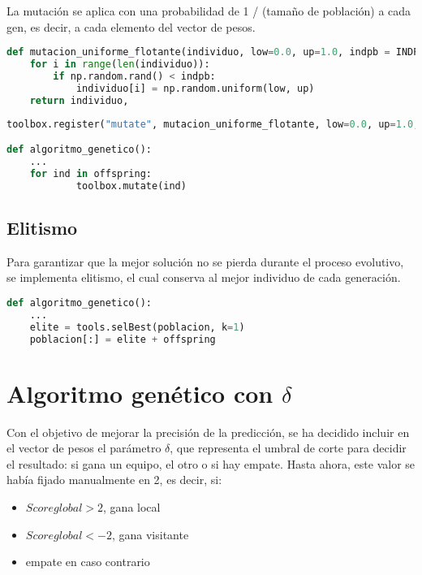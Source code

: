 La mutación se aplica con una probabilidad de 1 / (tamaño de población) a cada gen, es decir, a cada elemento del vector de pesos.
    
\begin{lstlisting}[language=Python, caption={Función mutación}, label={lst:codigo-python}]
def mutacion_uniforme_flotante(individuo, low=0.0, up=1.0, indpb = INDPB_MUTACION):
    for i in range(len(individuo)):
        if np.random.rand() < indpb:
            individuo[i] = np.random.uniform(low, up)
    return individuo,
\end{lstlisting}

\begin{lstlisting}[language=Python, caption={aplicación función mutación}, label={lst:codigo-python}]
toolbox.register("mutate", mutacion_uniforme_flotante, low=0.0, up=1.0, indpb=INDPB_MUTACION)

def algoritmo_genetico():
    ...
    for ind in offspring:
            toolbox.mutate(ind)
\end{lstlisting}

\subsection*{Elitismo}
Para garantizar que la mejor solución no se pierda durante el proceso evolutivo, se implementa elitismo, el cual conserva al mejor individuo de cada generación.

\begin{lstlisting}[language=Python, caption={Implementación elitismo}, label={lst:codigo-python}]
def algoritmo_genetico():
    ...
    elite = tools.selBest(poblacion, k=1)
    poblacion[:] = elite + offspring

\end{lstlisting}

\section{Algoritmo genético con $\delta$}
Con el objetivo de mejorar la precisión de la predicción, se ha decidido incluir en el vector de pesos el parámetro $\delta$, que representa el umbral de corte para decidir el resultado: si gana un equipo, el otro o si hay empate. Hasta ahora, este valor se había fijado manualmente en 2, es decir, si:

\begin{itemize}
    \item $Score global > 2$, gana local
    \item $Score global < -2$, gana visitante
    \item empate en caso contrario
\end{itemize}

